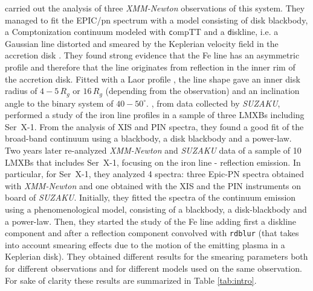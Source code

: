 \documentclass{aa}
\begin{document}
\citet{Bhatta.etal:07} carried out the analysis of three 
\emph{XMM-Newton} observations of this system. They managed to fit the EPIC/pn 
spectrum with a model consisting of disk blackbody, a Comptonization continuum 
modeled with {\texttt compTT} and a {\texttt diskline}, i.e. a Gaussian line 
distorted and smeared by the Keplerian velocity field in the accretion disk
\citep{Fabian.etal:89}.
They found strong evidence that the Fe line 
has an asymmetric profile 
and therefore that the line originates from reflection in the inner rim of 
the accretion disk. Fitted with a Laor profile \citep{Laor.etal:91}, the 
line shape gave an inner disk radius of $4-5 \, R_g$ or $16 \, R_g$ (depending 
from the observation) and an inclination angle to the binary system of 
$40-50^\circ$. \cite{Cackett.etal:08}, from data collected by 
\emph{SUZAKU}, performed a study of the iron line profiles in a 
sample of three LMXBs including Ser~X-1. From the analysis of XIS and PIN 
spectra, they found a good fit of the broad-band continuum using a 
blackbody, a disk blackbody and a power-law.
Two years later \cite{Cackett.etal:10} re-analyzed \emph{XMM-Newton} 
and  \emph{SUZAKU} data of a sample of 10 LMXBs that includes Ser~X-1, 
focusing on the iron line - reflection emission. In particular, for 
Ser~X-1, they analyzed 4 spectra: three Epic-PN spectra 
obtained with \emph{XMM-Newton} and one obtained with the XIS and 
the PIN instruments on board of \emph{SUZAKU}. Initially, they 
fitted the spectra of the continuum emission using a 
phenomenological model, consisting of a blackbody, a disk-blackbody 
and a power-law. Then, they started the study of the Fe line adding 
first a diskline component and after a reflection component convolved 
with \texttt{rdblur} (that takes into account smearing effects due 
to the motion of the emitting plasma in a Keplerian disk). 
They obtained different results for the smearing parameters both for 
different observations and for different models used on the same observation.
For sake of clarity these results are summarized in Table \ref{tab:intro}.
\end{document}
